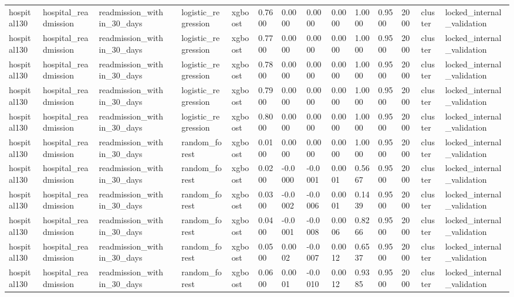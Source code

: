 \begin{tabular}{lllllllllllllll}
hospital130 & hospital\_readmission & readmission\_within\_30\_days &  & logistic\_regression & xgboost & 0.7600 & 0.0000 & 0.0000 & 0.0000 & 1.0000 & 0.9500 & 2000 & cluster & locked\_internal\_validation \\
hospital130 & hospital\_readmission & readmission\_within\_30\_days &  & logistic\_regression & xgboost & 0.7700 & 0.0000 & 0.0000 & 0.0000 & 1.0000 & 0.9500 & 2000 & cluster & locked\_internal\_validation \\
hospital130 & hospital\_readmission & readmission\_within\_30\_days &  & logistic\_regression & xgboost & 0.7800 & 0.0000 & 0.0000 & 0.0000 & 1.0000 & 0.9500 & 2000 & cluster & locked\_internal\_validation \\
hospital130 & hospital\_readmission & readmission\_within\_30\_days &  & logistic\_regression & xgboost & 0.7900 & 0.0000 & 0.0000 & 0.0000 & 1.0000 & 0.9500 & 2000 & cluster & locked\_internal\_validation \\
hospital130 & hospital\_readmission & readmission\_within\_30\_days &  & logistic\_regression & xgboost & 0.8000 & 0.0000 & 0.0000 & 0.0000 & 1.0000 & 0.9500 & 2000 & cluster & locked\_internal\_validation \\
hospital130 & hospital\_readmission & readmission\_within\_30\_days &  & random\_forest & xgboost & 0.0100 & 0.0000 & 0.0000 & 0.0000 & 1.0000 & 0.9500 & 2000 & cluster & locked\_internal\_validation \\
hospital130 & hospital\_readmission & readmission\_within\_30\_days &  & random\_forest & xgboost & 0.0200 & -0.0000 & -0.0001 & 0.0001 & 0.5667 & 0.9500 & 2000 & cluster & locked\_internal\_validation \\
hospital130 & hospital\_readmission & readmission\_within\_30\_days &  & random\_forest & xgboost & 0.0300 & -0.0002 & -0.0006 & 0.0001 & 0.1439 & 0.9500 & 2000 & cluster & locked\_internal\_validation \\
hospital130 & hospital\_readmission & readmission\_within\_30\_days &  & random\_forest & xgboost & 0.0400 & -0.0001 & -0.0008 & 0.0006 & 0.8266 & 0.9500 & 2000 & cluster & locked\_internal\_validation \\
hospital130 & hospital\_readmission & readmission\_within\_30\_days &  & random\_forest & xgboost & 0.0500 & 0.0002 & -0.0007 & 0.0012 & 0.6537 & 0.9500 & 2000 & cluster & locked\_internal\_validation \\
hospital130 & hospital\_readmission & readmission\_within\_30\_days &  & random\_forest & xgboost & 0.0600 & 0.0001 & -0.0010 & 0.0012 & 0.9385 & 0.9500 & 2000 & cluster & locked\_internal\_validation \\

\end{tabular}
